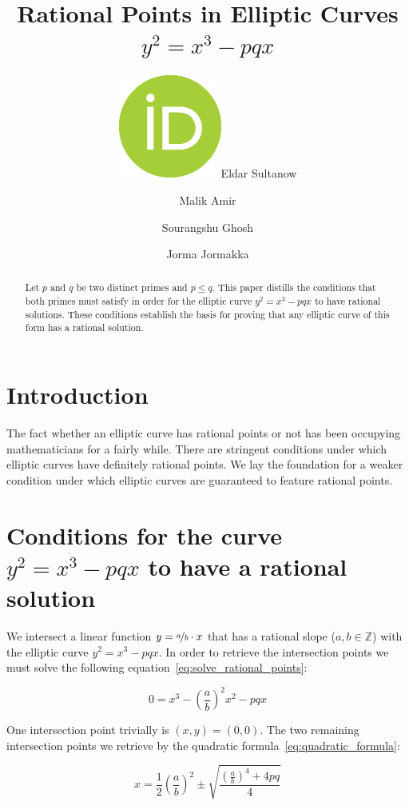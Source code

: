 \documentclass[12pt]{amsart}
\title[Rational Points in Elliptic Curves]{Rational Points in Elliptic Curves \boldmath$y^2=x^3-pqx$}
\author[E.\ Sultanow]{\href{https://orcid.org/0000-0001-5257-2236}{\includegraphics[scale=0.06]{orcid.png}}\hspace{1mm}Eldar Sultanow}
\author[M.\ Amir]{Malik Amir}
\author[S.\ Ghosh]{Sourangshu Ghosh}
\author[J.\ Jormakka]{Jorma Jormakka}
\theoremstyle{definition}
\begin{document}
	
	\begingroup
	\let\MakeUppercase\relax
	\maketitle
	\endgroup
	
	\begin{abstract}
		Let $p$ and $q$ be two distinct primes and $p\le q$. This paper distills the conditions that both primes must satisfy in order for the elliptic curve $y^2=x^3-pqx$ to have rational solutions. These conditions establish the basis for proving that any elliptic curve of this form has a rational solution.
	\end{abstract}
	
	\section{Introduction}
	\label{introduction}
	The fact whether an elliptic curve has rational points or not has been occupying mathematicians for a fairly while. There are stringent conditions under which elliptic curves have definitely rational points. We lay the foundation for a weaker condition under which elliptic curves are guaranteed to feature rational points.
	
	\section{\texorpdfstring{Conditions for the curve $y^2=x^3-pqx$ to have a rational solution}{Conditions for the curve y2=x3-pqx to have a rational solution}}
	\label{conditions}
	
	We intersect a linear function $y=\nicefrac{a}{b}\cdot x$ that has a rational slope ($a,b\in\mathbb{Z}$) with the elliptic curve $y^2=x^3-pqx$. In order to retrieve the intersection points we must solve the following equation~\ref{eq:solve_rational_points}:
	
	\begin{equation}
		\label{eq:solve_rational_points}
		0=x^3-\left(\frac{a}{b}\right)^2x^2-pqx
	\end{equation}
	
	One intersection point trivially is $(x,y)=(0,0)$. The two remaining intersection points we retrieve by the quadratic formula~\ref{eq:quadratic_formula}:
	
	\begin{equation}
		\label{eq:quadratic_formula}
		x=\frac{1}{2}\left(\frac{a}{b}\right)^2\pm\sqrt{\frac{\left(\frac{a}{b}\right)^4+4pq}{4}}
	\end{equation}
	
\end{document}
